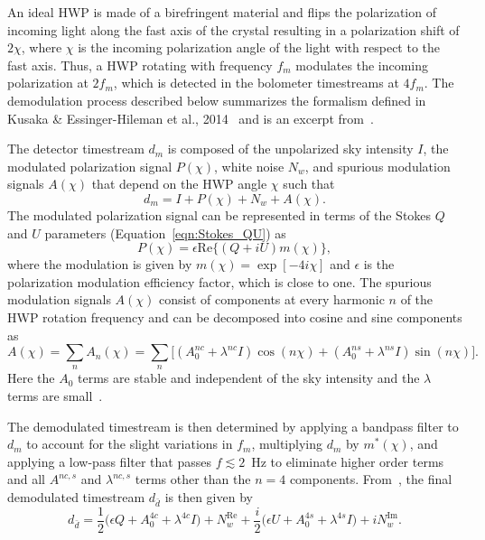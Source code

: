 An ideal HWP is made of a birefringent material and flips the polarization of incoming light along the fast axis of the crystal resulting in a polarization shift of $2\chi$, where $\chi$ is the incoming polarization angle of the light with respect to the fast axis. Thus, a HWP rotating with frequency $f_{m}$ modulates the incoming polarization at $2f_{m}$, which is detected in the bolometer timestreams at $4f_{m}$. The demodulation process described below summarizes the formalism defined in Kusaka \& Essinger-Hileman et al., 2014~\cite{ABS_HWP} and is an excerpt from~\cite{Simon_Thesis_2016}.

The detector timestream $d_{m}$ is composed of the unpolarized sky intensity $I$, the modulated polarization signal $P(\chi)$, white noise $N_{w}$, and spurious modulation signals $A(\chi)$ that depend on the HWP angle $\chi$ such that
\begin{equation}
d_{m}= I + P(\chi)+ N_{w} + A(\chi).
\end{equation}
The modulated polarization signal can be represented in terms of the Stokes $Q$ and $U$ parameters (Equation~\ref{eqn:Stokes_QU}) as
\begin{equation}
P(\chi)=\epsilon \mathrm{Re}\{(Q+iU) m(\chi)\},
\end{equation}
where the modulation is given by $m(\chi)=\exp[-4 i \chi]$ and $\epsilon$ is the polarization modulation efficiency factor, which is close to one. The spurious modulation signals $A(\chi)$ consist of components at every harmonic $n$ of the HWP rotation frequency and can be decomposed into cosine and sine components as
\begin{equation}\label{eqn:achi}
A(\chi)= \sum_{n} A_n(\chi)=\sum_{n}\Big[ (A^{nc}_{0} + \lambda^{nc} I) \cos(n\chi) + (A^{ns}_{0} + \lambda^{ns} I) \sin(n\chi)    \Big].
\end{equation}
Here the $A_{0}$ terms are stable and independent of the sky intensity and the $\lambda$ terms are small~\cite{ABS_HWP}.

The demodulated timestream is then determined by applying a bandpass filter to $d_{m}$ to account for the slight variations in $f_{m}$, multiplying $d_{m}$ by $m^*(\chi)$, and applying a low-pass filter that passes $f\lesssim2$~Hz to eliminate higher order terms and all $A^{nc,s}$ and $\lambda^{nc,s}$ terms other than the $n=4$ components. From~\cite{ABS_HWP}, the final demodulated timestream $d_{\bar{d}}$ is then given by
\begin{equation}
d_{\bar{d}}=\frac{1}{2}\Big(\epsilon Q + A^{4c}_{0} + \lambda^{4c} I \Big) + N^{\mathrm{Re}}_{w} + \frac{i}{2}\Big(\epsilon U + A^{4s}_{0} + \lambda^{4s} I \Big) + iN^{\mathrm{Im}}_{w}.
\end{equation}
